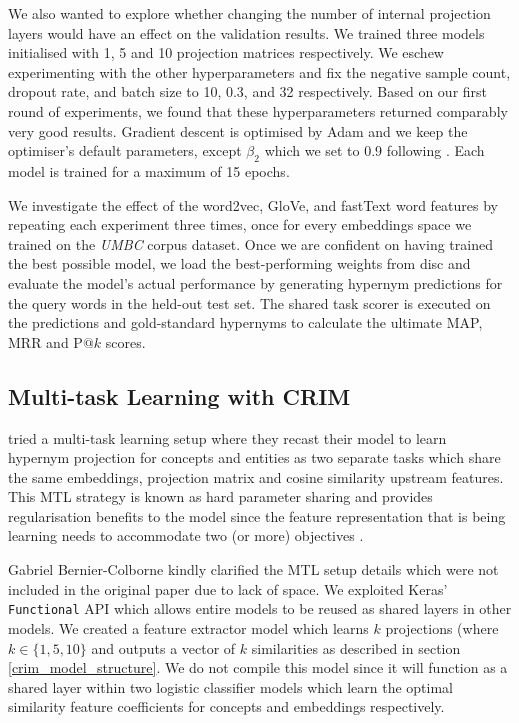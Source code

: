 We also wanted to explore whether changing the number of internal projection layers would have an effect on the validation results.  We trained three models initialised with 1, 5 and 10 projection matrices respectively.  We eschew experimenting with the other hyperparameters and fix the negative sample count, dropout rate, and batch size to 10, 0.3, and 32 respectively.  Based on our first round of experiments, we found that these hyperparameters returned comparably very good results.  Gradient descent is optimised by Adam \citep{kingma2014adam} and we keep the optimiser's default parameters, except $\beta_2$ which we set to 0.9 following \citep{bernier2018crim}.  Each model is trained for a maximum of 15 epochs.

We investigate the effect of the word2vec, GloVe, and fastText word features by repeating each experiment three times, once for every embeddings space we trained on the \textit{UMBC} corpus dataset.  Once we are confident on having trained the best possible model, we load the best-performing weights from disc and  evaluate the model's actual performance by generating hypernym predictions for the query words in the held-out test set.  The shared task scorer is executed on the predictions and gold-standard hypernyms to calculate the ultimate \ac{MAP}, \ac{MRR} and P$@k$ scores.

\subsection{Multi-task Learning with CRIM}
\citet{bernier2018crim} tried a multi-task learning setup where they recast their model to learn hypernym projection for concepts and entities as two separate tasks which share the same embeddings, projection matrix and cosine similarity upstream features.  This \ac{MTL} strategy is known as hard parameter sharing and provides regularisation benefits to the model since the feature representation that is being learning needs to accommodate two (or more) objectives \citep{ruder2017overview}.

Gabriel Bernier-Colborne kindly clarified the \ac{MTL} setup details which were not included in the original paper due to lack of space.  We exploited Keras' \texttt{Functional} API which allows entire models to be reused as shared layers in other models.  We created a feature extractor model which learns $k$ projections (where $k \in \{1, 5, 10\}$  and outputs a vector of $k$ similarities as described in section \ref{crim_model_structure}.  We do not compile this model since it will function as a shared layer within two logistic classifier models which learn the optimal similarity feature coefficients for concepts and embeddings respectively.

